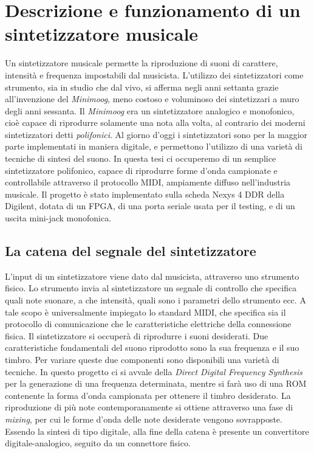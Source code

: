 \chapter{Descrizione e funzionamento di un sintetizzatore musicale}
Un sintetizzatore musicale permette la riproduzione di suoni di carattere, intensità e frequenza impostabili dal musicista.
L'utilizzo dei sintetizzatori come strumento, sia in studio che dal vivo, si afferma negli anni settanta grazie all'invenzione del \textit{Minimoog}, meno costoso e voluminoso dei sintetizzari a muro degli anni sessanta.
Il \textit{Minimoog} era un sintetizzatore analogico e monofonico, cioè capace di riprodurre solamente una nota alla volta, al contrario dei moderni sintetizzatori detti \textit{polifonici}.
Al giorno d'oggi i sintetizzatori sono per la maggior parte implementati in maniera digitale, e permettono l'utilizzo di una varietà di tecniche di sintesi del suono.
In questa tesi ci occuperemo di un semplice sintetizzatore polifonico, capace di riprodurre forme d'onda campionate e controllabile attraverso il protocollo MIDI, ampiamente diffuso nell'industria musicale.
Il progetto è stato implementato sulla scheda Nexys 4 DDR della Digilent, dotata di un FPGA, di una porta seriale usata per il testing, e di un uscita mini-jack monofonica.

\section{La catena del segnale del sintetizzatore}
L'input di un sintetizzatore viene dato dal musicista, attraverso uno strumento fisico. Lo strumento invia al sintetizzatore un segnale di controllo che specifica quali note suonare, a che intensità, quali sono i parametri dello strumento ecc. A tale scopo è universalmente impiegato lo standard MIDI, che specifica sia il protocollo di comunicazione che le caratteristiche elettriche della connessione fisica.
Il sintetizzatore si occuperà di riprodurre i suoni desiderati. Due caratteristiche fondamentali del suono riprodotto sono la sua frequenza e il suo timbro. Per variare queste due componenti sono disponibili una varietà di tecniche.
In questo progetto ci si avvale della \textit{Direct Digital Frequency Synthesis} per la generazione di una frequenza determinata, mentre si farà uso di una ROM contenente la forma d'onda campionata per ottenere il timbro desiderato.
La riproduzione di più note contemporanamente si ottiene attraverso una fase di \textit{mixing}, per cui le forme d'onda delle note desiderate vengono sovrapposte.
Essendo la sintesi di tipo digitale, alla fine della catena è presente un convertitore digitale-analogico,
seguito da un connettore fisico.

